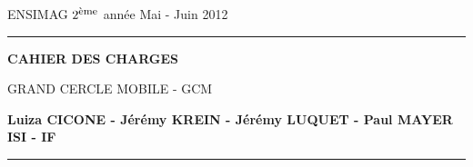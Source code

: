 \documentclass[a4paper,11pt]{article}
\newcommand{\noi}{\noindent}
\begin{document}
\baselineskip7mm

\noi ENSIMAG $2^{\footnotesize \mbox{ème}}$ année   \hfill Mai - Juin 2012


\vspace{7cm}
\rule{\linewidth}{.5pt}
\vspace{2mm}


\begin{center}
{\Huge \bf CAHIER DES CHARGES

\vspace{1cm}

GRAND CERCLE MOBILE - GCM}
\end{center}


\vspace{1cm}

\begin{center}
$ $\\
\large{ \textbf{Luiza CICONE - Jérémy KREIN - Jérémy LUQUET - Paul MAYER}}\\
\large{ \textbf{ISI - IF}}
$ $\\
\end{center}
\rule{\linewidth}{.5pt}

\newpage
\end{document}
